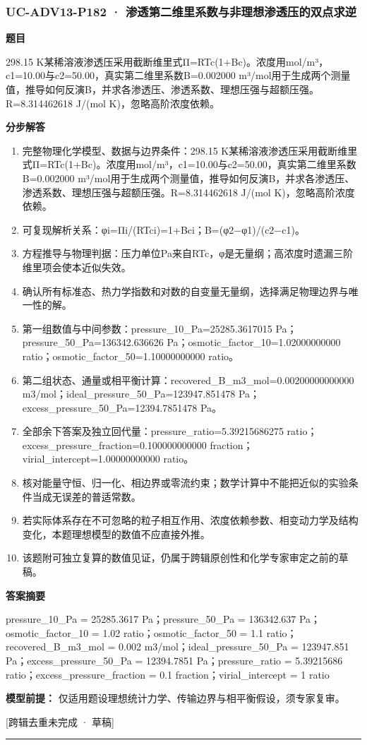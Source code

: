 \documentclass[UTF8,11pt,a4paper]{ctexart}
\begin{document}
\subsubsection*{UC-ADV13-P182 · 渗透第二维里系数与非理想渗透压的双点求逆}
\noindent\textbf{题目}\par
298.15 K某稀溶液渗透压采用截断维里式Π=RTc(1+Bc)。浓度用mol/m³，c1=10.00与c2=50.00，真实第二维里系数B=0.002000 m³/mol用于生成两个测量值，推导如何反演B，并求各渗透压、渗透系数、理想压强与超额压强。R=8.314462618 J/(mol K)，忽略高阶浓度依赖。\par
\medskip\noindent\textbf{分步解答}
\begin{enumerate}
\item 完整物理化学模型、数据与边界条件：298.15 K某稀溶液渗透压采用截断维里式Π=RTc(1+Bc)。浓度用mol/m³，c1=10.00与c2=50.00，真实第二维里系数B=0.002000 m³/mol用于生成两个测量值，推导如何反演B，并求各渗透压、渗透系数、理想压强与超额压强。R=8.314462618 J/(mol K)，忽略高阶浓度依赖。
\item 可复现解析关系：φi=Πi/(RTci)=1+Bci；B=(φ2−φ1)/(c2−c1)。
\item 方程推导与物理判据：压力单位Pa来自RTc，φ是无量纲；高浓度时遗漏三阶维里项会使本近似失效。
\item 确认所有标准态、热力学指数和对数的自变量无量纲，选择满足物理边界与唯一性的解。
\item 第一组数值与中间参数：pressure\_10\_Pa=25285.3617015 Pa；pressure\_50\_Pa=136342.636626 Pa；osmotic\_factor\_10=1.02000000000 ratio；osmotic\_factor\_50=1.10000000000 ratio。
\item 第二组状态、通量或相平衡计算：recovered\_B\_m3\_mol=0.00200000000000 m3/mol；ideal\_pressure\_50\_Pa=123947.851478 Pa；excess\_pressure\_50\_Pa=12394.7851478 Pa。
\item 全部余下答案及独立回代量：pressure\_ratio=5.39215686275 ratio；excess\_pressure\_fraction=0.100000000000 fraction；virial\_intercept=1.00000000000 ratio。
\item 核对能量守恒、归一化、相边界或零流约束；数学计算中不能把近似的实验条件当成无误差的普适常数。
\item 若实际体系存在不可忽略的粒子相互作用、浓度依赖参数、相变动力学及结构变化，本题理想模型的数值不应直接外推。
\item 该题附可独立复算的数值见证，仍属于跨辑原创性和化学专家审定之前的草稿。
\end{enumerate}
\noindent\textbf{答案摘要}\par
pressure\_10\_Pa = 25285.3617 Pa；pressure\_50\_Pa = 136342.637 Pa；osmotic\_factor\_10 = 1.02 ratio；osmotic\_factor\_50 = 1.1 ratio；recovered\_B\_m3\_mol = 0.002 m3/mol；ideal\_pressure\_50\_Pa = 123947.851 Pa；excess\_pressure\_50\_Pa = 12394.7851 Pa；pressure\_ratio = 5.39215686 ratio；excess\_pressure\_fraction = 0.1 fraction；virial\_intercept = 1 ratio\par
\noindent\textbf{模型前提：}
仅适用题设理想统计力学、传输边界与相平衡假设，须专家复审。\par
\noindent\textcolor{red!65!black}{[跨辑去重未完成 · 草稿]} \par
\medskip\hrule\medskip
{}
\end{document}

